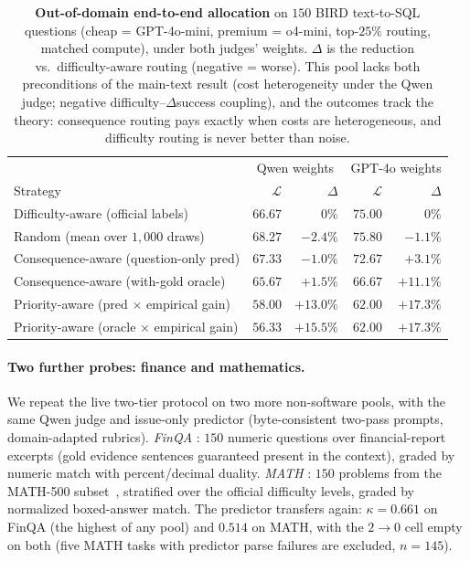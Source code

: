 \documentclass{article}
\begin{document}
\begin{table}[h]
\centering
\caption{\textbf{Out-of-domain end-to-end allocation} on $150$ BIRD
text-to-SQL questions (cheap = GPT-4o-mini, premium = o4-mini,
top-$25\%$ routing, matched compute), under both judges' weights.
$\Delta$ is the reduction vs.\ difficulty-aware routing (negative =
worse). This pool lacks both preconditions of the main-text result
(cost heterogeneity under the Qwen judge; negative
difficulty--$\Delta$success coupling), and the outcomes track the
theory: consequence routing pays exactly when costs are
heterogeneous, and difficulty routing is never better than noise.}
\label{tab:ood}
\small
\begin{tabular}{lrrrr}
\toprule
& \multicolumn{2}{c}{Qwen weights} & \multicolumn{2}{c}{GPT-4o weights} \\
Strategy & $\mathcal{L}$ & $\Delta$ & $\mathcal{L}$ & $\Delta$ \\
\midrule
Difficulty-aware (official labels) & $66.67$ & $0\%$ & $75.00$ & $0\%$ \\
Random (mean over $1{,}000$ draws) & $68.27$ & $-2.4\%$ & $75.80$ & $-1.1\%$ \\
Consequence-aware (question-only pred) & $67.33$ & $-1.0\%$ & $72.67$ & $+3.1\%$ \\
Consequence-aware (with-gold oracle) & $65.67$ & $+1.5\%$ & $66.67$ & $+11.1\%$ \\
Priority-aware (pred $\times$ empirical gain) & $58.00$ & $+13.0\%$ & $62.00$ & $+17.3\%$ \\
Priority-aware (oracle $\times$ empirical gain) & $\mathbf{56.33}$ & $\mathbf{+15.5\%}$ & $\mathbf{62.00}$ & $\mathbf{+17.3\%}$ \\
\bottomrule
\end{tabular}
\end{table}

\paragraph{Two further probes: finance and mathematics.} We repeat
the live two-tier protocol on two more non-software pools, with the
same Qwen judge and issue-only predictor (byte-consistent two-pass
prompts, domain-adapted rubrics). \emph{FinQA}
\citep{chen2021finqa}: $150$ numeric questions over financial-report
excerpts (gold evidence sentences guaranteed present in the context),
graded by numeric match with percent/decimal duality. \emph{MATH}
\citep{hendrycks2021math}: $150$ problems from the MATH-500
subset~\citep{lightman2023verify}, stratified over the official
difficulty levels, graded by normalized boxed-answer match. The
predictor transfers again: $\kappa = 0.661$ on FinQA (the highest of
any pool) and $0.514$ on MATH, with the $2{\to}0$ cell empty on both
(five MATH tasks with predictor parse failures are excluded,
$n{=}145$).
\end{document}
